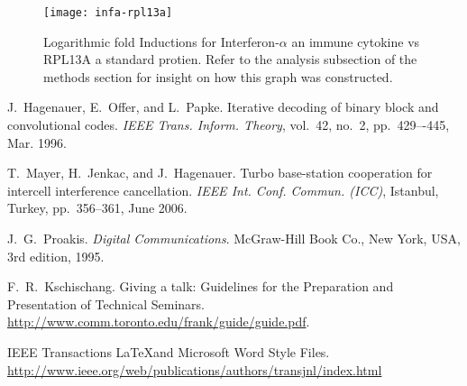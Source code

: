 \documentclass[journal, a4paper]{IEEEtran}
\begin{document}
  \begin{figure}[t]
    \centering
    \texttt{[image: infa-rpl13a]}
    \caption{
    Logarithmic fold Inductions for Interferon-$\alpha$ an immune cytokine vs RPL13A a standard protien.
    Refer to the analysis subsection of the methods section for insight on how this graph was constructed.
    }
    \label{fig:mesh1}
  \end{figure}

\begin{thebibliography}{5}
    J.~Hagenauer, E.~Offer, and L.~Papke. Iterative decoding of binary block
    and convolutional codes. {\em IEEE Trans. Inform. Theory},
    vol.~42, no.~2, pp.~429–-445, Mar. 1996.

    T.~Mayer, H.~Jenkac, and J.~Hagenauer. Turbo base-station cooperation for intercell interference cancellation. {\em IEEE Int. Conf. Commun. (ICC)}, Istanbul, Turkey, pp.~356--361, June 2006.

    J.~G.~Proakis. {\em Digital Communications}. McGraw-Hill Book Co.,
    New York, USA, 3rd edition, 1995.

    F.~R.~Kschischang. Giving a talk: Guidelines for the Preparation and Presentation of Technical Seminars.
    \url{http://www.comm.toronto.edu/frank/guide/guide.pdf}.

    IEEE Transactions \LaTeX and Microsoft Word Style Files.
    \url{http://www.ieee.org/web/publications/authors/transjnl/index.html}



\end{thebibliography}

\end{document}
